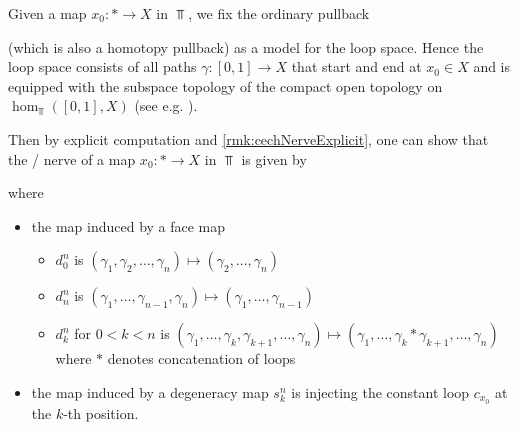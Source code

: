 \begin{remark}
    Given a map $x_0\colon*\to X$ in $\Top$, we fix the ordinary pullback
    \begin{center}
    \end{center}
    (which is also a homotopy pullback) as a model for the loop space.
    Hence the loop space consists of all paths $\gamma\colon [0,1]\to X$ that start and end at $x_0\in X$ and is equipped with the subspace topology of the compact open topology on $\hom_{\Top}\left([0,1],X\right)$ (see e.g. \cite[Definition 1.2.1]{cubical_htpy_theory}).
    
    Then by explicit computation and \cref{rmk:cechNerveExplicit}, one can show that the \Cech/ nerve of a map $x_0\colon*\to X$ in $\Top$ is given by
    \begin{center}
    \end{center}
    where
    \begin{itemize}
        \item the map induced by a face map 
        \begin{itemize}
            \item $d_0^n$ is $(\gamma_1,\gamma_2,\ldots,\gamma_n)\mapsto(\gamma_2,\ldots,\gamma_n)$
            \item $d_n^n$ is $(\gamma_1,\ldots,\gamma_{n-1},\gamma_n)\mapsto(\gamma_1,\ldots,\gamma_{n-1})$
            \item $d_k^n$ for $0<k<n$ is $(\gamma_1,\ldots,\gamma_k,\gamma_{k+1},\ldots,\gamma_n)\mapsto(\gamma_1,\ldots,\gamma_k*\gamma_{k+1},\ldots,\gamma_n)$ where $*$ denotes concatenation of loops
        \end{itemize}
        \item the map induced by a degeneracy map $s_k^n$ is injecting the constant loop $c_{x_0}$ at the $k$-th position.
    \end{itemize}
\end{remark}
